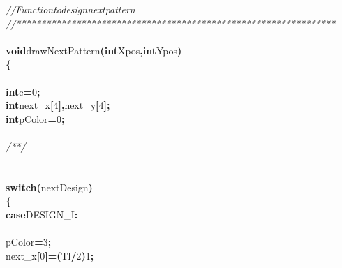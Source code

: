 \documentclass[a4paper, 10pt]{article}
\newcommand\SPC{\hspace*{0.6em}}
\newcommand\HYP{\mbox{\char 45}}
\newcommand{\CppAComment}[1]{\textit{\textcolor[rgb]{0.2,0.6,1}{#1}}}
\newcommand{\CppAIdentifier}[1]{#1}
\newcommand{\CppANumber}[1]{\textcolor[rgb]{0.5,0,0.5}{#1}}
\newcommand{\CppAReservedWord}[1]{\textbf{#1}}
\newcommand{\CppASpace}[1]{\colorbox[rgb]{1,1,1}{#1}}
\newcommand{\CppASymbol}[1]{\textbf{\textcolor[rgb]{1,0,0}{#1}}}
\begin{document}
\begin{ttfamily}
\CppAComment{//\SPC \SPC Function\SPC to\SPC design\SPC next\SPC pattern}\\
\CppAComment{//****************************************************************}\\
\\
\CppAReservedWord{void}\CppASpace{\SPC }\CppAIdentifier{drawNextPattern}\CppASymbol{(}\CppAReservedWord{int}\CppASpace{\SPC }\CppAIdentifier{Xpos}\CppASymbol{,}\CppASpace{\SPC }\CppAReservedWord{int}\CppASpace{\SPC }\CppAIdentifier{Ypos}\CppASymbol{)}\\
\CppASymbol{\{}\\
\\
\CppASpace{\SPC }\CppAReservedWord{int}\CppASpace{\SPC }\CppAIdentifier{c}\CppASymbol{=}\CppANumber{0}\CppASymbol{;}\\
\CppASpace{\SPC }\CppAReservedWord{int}\CppASpace{\SPC }\CppAIdentifier{next\_x}\CppASymbol{[}\CppANumber{4}\CppASymbol{]}\CppASymbol{,}\CppAIdentifier{next\_y}\CppASymbol{[}\CppANumber{4}\CppASymbol{]}\CppASymbol{;}\\
\CppASpace{\SPC }\CppAReservedWord{int}\CppASpace{\SPC }\CppAIdentifier{pColor}\CppASymbol{=}\CppANumber{0}\CppASymbol{;}\\
\\
\CppASpace{\SPC }\CppAComment{/*\HYP \HYP \HYP \HYP \HYP \HYP \HYP \HYP \HYP \HYP \HYP \HYP \HYP \HYP \HYP \HYP \HYP \HYP \HYP \HYP \HYP \HYP \HYP \HYP \HYP \HYP \HYP \HYP \HYP \HYP \HYP \HYP \HYP \HYP \HYP \HYP \HYP \HYP \HYP \HYP \HYP \HYP \HYP \HYP \HYP \HYP \HYP \HYP \HYP \HYP \HYP \HYP \HYP \HYP \HYP \HYP \HYP \HYP \HYP \HYP \HYP \HYP \HYP \HYP \HYP \HYP \HYP */}\\
\\
\\
\CppASpace{\SPC }\CppAReservedWord{switch}\CppASymbol{(}\CppAIdentifier{nextDesign}\CppASymbol{)}\\
\CppASpace{\SPC }\CppASymbol{\{}\\
\CppASpace{\SPC \SPC }\CppAReservedWord{case}\CppASpace{\SPC }\CppAIdentifier{DESIGN\_I}\CppASymbol{:}\\
\\
\CppASpace{\SPC \SPC }\CppAIdentifier{pColor}\CppASymbol{=}\CppANumber{3}\CppASymbol{;}\\
\CppASpace{\SPC \SPC }\CppAIdentifier{next\_x}\CppASymbol{[}\CppANumber{0}\CppASymbol{]}\CppASymbol{=}\CppASymbol{(}\CppAIdentifier{Tl}\CppASymbol{/}\CppANumber{2}\CppASymbol{)}\CppASymbol{\HYP }\CppANumber{1}\CppASymbol{;}\\

\end{ttfamily}
\end{document}
